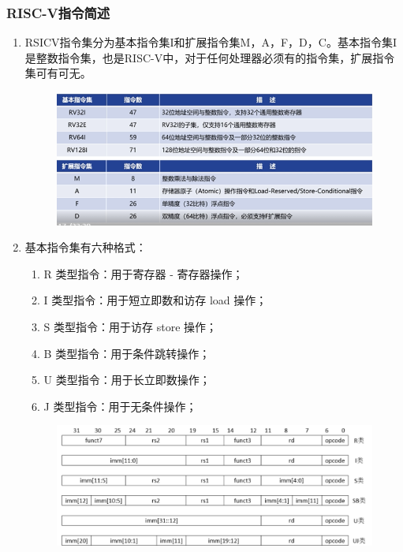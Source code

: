\documentclass[a4paper, 14pt, oneside]{book} %
\numberwithin{equation}{subsection}
\begin{document}
			\subsubsection{RISC-V指令简述}
				\begin{enumerate}
					\item 
						RSICV指令集分为基本指令集I和扩展指令集M，A，F，D，C。基本指令集I是整数指令集，也是RISC-V中，对于任何处理器必须有的指令集，扩展指令集可有可无。
						\begin{figure}[H]
							\centering
							\includegraphics[scale=0.6]{img/two.png}
						\end{figure}
					\item
						基本指令集有六种格式：
					\begin{enumerate}		
						\item 
							R 类型指令：用于寄存器 - 寄存器操作；
						\item 
							I 类型指令：用于短立即数和访存 load 操作；
						\item 
							S 类型指令：用于访存 store 操作；
						\item 
							B 类型指令：用于条件跳转操作；
						\item 
							U 类型指令：用于长立即数操作；
						\item 
							J 类型指令：用于无条件操作；
					\end{enumerate}
					\begin{figure}[H]
						\centering
						\includegraphics[scale=0.5]{img/three.png}
					\end{figure}
				\end{enumerate}
\end{document}
